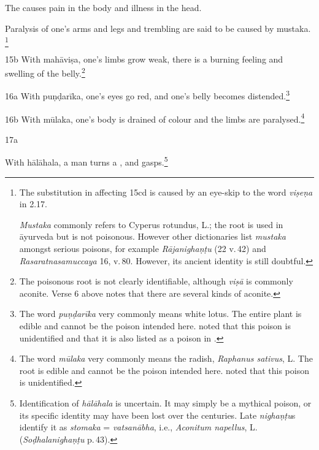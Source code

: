 \begin{translation}
The  causes pain in
the body and illness in the head. 

Paralysis of one's arms and legs and trembling are said to be
caused by \gls{mustaka}.%
\footnote{The substitution in  affecting 15cd is
    caused by an eye-skip to the word \emph{viṣeṇa} in 2.17. 
    
    \emph{Mustaka} commonly refers to Cyperus rotundus, L.; the root is
    used in āyurveda but is not poisonous.  However other dictionaries
    list \emph{mustaka} amongst serious poisons, for example
    \emph{Rājanighaṇṭu} (22 v.\,42) and \emph{Rasaratnasamuccaya} 16,
    v.\,80.  However, its ancient identity is still doubtful.} 

\item[15b] With \gls{mahāviṣa},
    one's limbs grow weak, there is a burning feeling and swelling of
    the belly.\footnote{The poisonous root  is not clearly 
    identifiable, although \emph{viṣā} is
        commonly aconite.  Verse 6 above notes that there are several
        kinds of aconite.} 
        
\item[ 16a] With \gls{puṇḍarīka},  
        one's eyes go red, and one's belly becomes
        distended.\footnote{The word \emph{puṇḍarīka} very commonly means
            white lotus. The entire plant is
            edible and cannot be the poison intended here. \citet[252]{gvdb}
            noted that this poison is unidentified and that it is also listed
            as a poison in .}

\item[ 16b] With \gls{mūlaka},    
            one's body is drained of colour and the limbs are
            paralysed.\footnote{The word \emph{mūlaka} very commonly means
                the radish, \emph{Raphanus sativus}, L. The root is edible and
                cannot be the poison intended here. \citet[317]{gvdb} noted that
                this poison is unidentified.}
    
    \item[ 17a]
        
    With \gls{hālāhala}, a man turns a , and
gasps.\footnote{Identification of \emph{hālāhala} is  uncertain. It may simply
be a mythical poison, or its specific identity may have been lost over the
centuries. Late \emph{nighaṇṭu}s identify it as \emph{stomaka} =
\emph{vatsanābha}, i.e., \emph{Aconitum napellus}, L. 
(\emph{Soḍhalanighaṇṭu} p.\,43). 

}
\end{translation}
